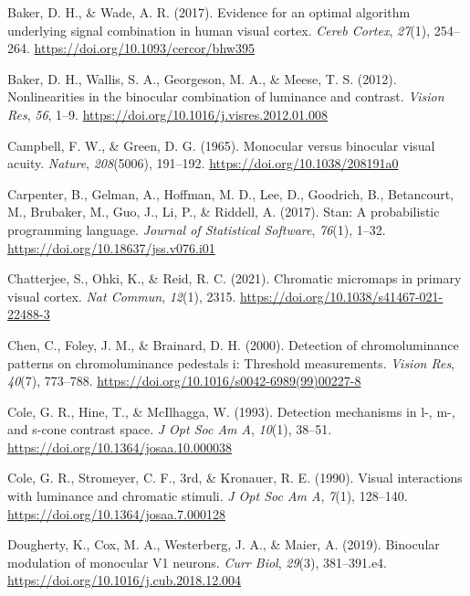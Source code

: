\documentclass[
  letterpaper,
  DIV=11,
  numbers=noendperiod]{scrartcl}
\newlength{\cslhangindent}
\newenvironment{CSLReferences}[2] %
 {\begin{list}{}{%
  \setlength{\itemindent}{0pt}
  \setlength{\leftmargin}{0pt}
  \setlength{\parsep}{0pt}
  \ifodd #1
   \setlength{\leftmargin}{\cslhangindent}
   \setlength{\itemindent}{-1\cslhangindent}
  \fi
  \setlength{\itemsep}{#2\baselineskip}}}
 {\end{list}}
\begin{document}
\begin{CSLReferences}{1}{0}
Baker, D. H., \& Wade, A. R. (2017). Evidence for an optimal algorithm
underlying signal combination in human visual cortex. \emph{Cereb
Cortex}, \emph{27}(1), 254--264.
\url{https://doi.org/10.1093/cercor/bhw395}

Baker, D. H., Wallis, S. A., Georgeson, M. A., \& Meese, T. S. (2012).
Nonlinearities in the binocular combination of luminance and contrast.
\emph{Vision Res}, \emph{56}, 1--9.
\url{https://doi.org/10.1016/j.visres.2012.01.008}

Campbell, F. W., \& Green, D. G. (1965). Monocular versus binocular
visual acuity. \emph{Nature}, \emph{208}(5006), 191--192.
\url{https://doi.org/10.1038/208191a0}

Carpenter, B., Gelman, A., Hoffman, M. D., Lee, D., Goodrich, B.,
Betancourt, M., Brubaker, M., Guo, J., Li, P., \& Riddell, A. (2017).
Stan: A probabilistic programming language. \emph{Journal of Statistical
Software}, \emph{76}(1), 1--32.
\url{https://doi.org/10.18637/jss.v076.i01}

Chatterjee, S., Ohki, K., \& Reid, R. C. (2021). Chromatic micromaps in
primary visual cortex. \emph{Nat Commun}, \emph{12}(1), 2315.
\url{https://doi.org/10.1038/s41467-021-22488-3}

Chen, C., Foley, J. M., \& Brainard, D. H. (2000). Detection of
chromoluminance patterns on chromoluminance pedestals i: Threshold
measurements. \emph{Vision Res}, \emph{40}(7), 773--788.
\url{https://doi.org/10.1016/s0042-6989(99)00227-8}

Cole, G. R., Hine, T., \& McIlhagga, W. (1993). Detection mechanisms in
l-, m-, and s-cone contrast space. \emph{J Opt Soc Am A}, \emph{10}(1),
38--51. \url{https://doi.org/10.1364/josaa.10.000038}

Cole, G. R., Stromeyer, C. F., 3rd, \& Kronauer, R. E. (1990). Visual
interactions with luminance and chromatic stimuli. \emph{J Opt Soc Am
A}, \emph{7}(1), 128--140. \url{https://doi.org/10.1364/josaa.7.000128}

Dougherty, K., Cox, M. A., Westerberg, J. A., \& Maier, A. (2019).
Binocular modulation of monocular V1 neurons. \emph{Curr Biol},
\emph{29}(3), 381--391.e4.
\url{https://doi.org/10.1016/j.cub.2018.12.004}


\end{CSLReferences}
\end{document}
